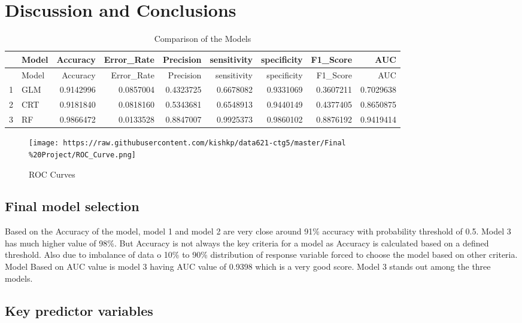 \documentclass[english,floatsintext,man]{apa6}
\begin{document}
\section{Discussion and Conclusions}\label{discussion-and-conclusions}

\begin{longtable}[c]{@{}llrrrrrrr@{}}
\caption{Comparison of the Models}\tabularnewline
\toprule
& Model & Accuracy & Error\_Rate & Precision & sensitivity & specificity
& F1\_Score & AUC\tabularnewline
\midrule
\endfirsthead
\toprule
& Model & Accuracy & Error\_Rate & Precision & sensitivity & specificity
& F1\_Score & AUC\tabularnewline
\midrule
\endhead
1 & GLM & 0.9142996 & 0.0857004 & 0.4323725 & 0.6678082 & 0.9331069 &
0.3607211 & 0.7029638\tabularnewline
2 & CRT & 0.9181840 & 0.0818160 & 0.5343681 & 0.6548913 & 0.9440149 &
0.4377405 & 0.8650875\tabularnewline
3 & RF & 0.9866472 & 0.0133528 & 0.8847007 & 0.9925373 & 0.9860102 &
0.8876192 & 0.9419414\tabularnewline
\bottomrule
\end{longtable}

\begin{figure}[htbp]
\centering
\texttt{[image: https://raw.githubusercontent.com/kishkp/data621-ctg5/master/Final\\\%20Project/ROC\_Curve.png]}
\caption{ROC Curves}
\end{figure}

\subsection{Final model selection}\label{final-model-selection}

Based on the Accuracy of the model, model 1 and model 2 are very close
around 91\% accuracy with probability threshold of 0.5. Model 3 has much
higher value of 98\%. But Accuracy is not always the key criteria for a
model as Accuracy is calculated based on a defined threshold. Also due
to imbalance of data o 10\% to 90\% distribution of response variable
forced to choose the model based on other criteria. Model Based on AUC
value is model 3 having AUC value of 0.9398 which is a very good score.
Model 3 stands out among the three models.

\subsection{Key predictor variables}\label{key-predictor-variables}
\end{document}
